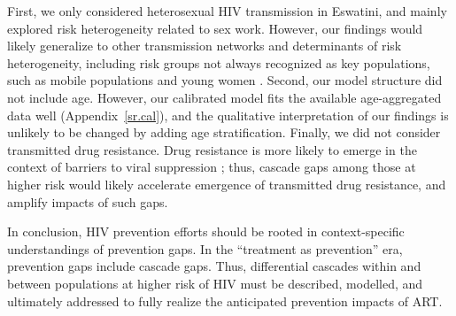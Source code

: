 First, we only considered heterosexual HIV transmission in Eswatini,
and mainly explored risk heterogeneity related to sex work.
However, our findings would likely generalize
to other transmission networks and determinants of risk heterogeneity,
including risk groups not always recognized as key populations,
such as mobile populations and young women \cite{Camlin2019,Cheuk2020}.
Second, our model structure did not include age.
However, our calibrated model fits
the available age-aggregated data well (Appendix~\ref{sr.cal}),
and the qualitative interpretation of our findings
is unlikely to be changed by adding age stratification.
Finally, we did not consider transmitted drug resistance.
Drug resistance is more likely to emerge
in the context of barriers to viral suppression \cite{Pham2014};
thus, cascade gaps among those at higher risk
would likely accelerate emergence of transmitted drug resistance, and amplify impacts of such gaps.
\par
In conclusion, HIV prevention efforts should be rooted in
context-specific understandings of prevention gaps.
In the ``treatment as prevention'' era, prevention gaps include cascade gaps.
Thus, differential cascades within and between populations at higher risk of HIV
must be described, modelled, and ultimately addressed
to fully realize the anticipated prevention impacts of ART.
\enlargethispage{2ex} %
